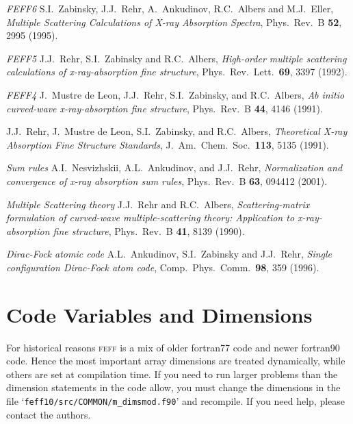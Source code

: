 \documentclass[11pt,oneside]{report} %
\newcommand{\program}[1]{\textsc{#1}}
\newcommand{\feff}{\program{feff}}
\newcommand{\file}[1]{`\texttt{#1}'}
\begin{document}
\begin{latexonly}
\begin{Reflist}
\item [\textit{FEFF6}] S.I.\ Zabinsky, J.J.\ Rehr, A.\ Ankudinov, R.C.\
  Albers and M.J.\ Eller, \emph{Multiple Scattering Calculations of
    X-ray Absorption Spectra}, Phys.\ Rev.\ B \textbf{52}, 2995 (1995).
 
\item [\textit{FEFF5}] J.J.\ Rehr, S.I.\ Zabinsky and R.C.\ Albers,
  \emph{High-order multiple scattering calculations of
    x-ray-absorption fine structure}, Phys.\ Rev.\ Lett.\ \textbf{69},
  3397 (1992).
  
\item [\textit{FEFF4}] J.\ Mustre de Leon, J.J.\ Rehr, S.I.\
  Zabinsky, and R.C.\ Albers, \emph{Ab initio curved-wave
    x-ray-absorption fine structure}, Phys.\ Rev.\ B \textbf{44}, 4146
  (1991).
 
 J.J.\ Rehr, J.\ Mustre de Leon, S.I.\ Zabinsky, and
  R.C.\ Albers, \emph{Theoretical X-ray Absorption Fine Structure
    Standards}, J.\ Am.\ Chem.\ Soc.\ \textbf{113}, 5135 (1991).
 
\item [\textit{Sum rules}]
A.I.\ Nesvizhskii, A.L.\ Ankudinov, and J.J.\ Rehr,
  \emph{Normalization and convergence of x-ray absorption sum
  rules}, Phys.\ Rev.\ B \textbf{63}, 094412 (2001).
 
\item [\textit{Multiple Scattering theory}] J.J.\ Rehr and R.C.\ Albers,
  \emph{Scattering-matrix formulation of curved-wave
    multiple-scattering theory: Application to x-ray-absorption fine
    structure}, Phys.\ Rev.\ B \textbf{41}, 8139 (1990).
 
\item [\textit{Dirac-Fock atomic code}] A.L.\ Ankudinov, S.I.\ Zabinsky and J.J.\
  Rehr, \emph{Single configuration Dirac-Fock atom code}, Comp.\ Phys.\
  Comm.\ \textbf{98}, 359 (1996).

\end{Reflist}



\chapter{Code Variables and Dimensions}
\label{sec:Append-D-Code}
For historical reasons {\feff} is a mix of older fortran77 code and newer
fortran90 code. Hence the most important array dimensions are treated dynamically,
while others are set at compilation time.  If you need
to run larger problems than the dimension statements in the code
allow, you must change the dimensions in the file \file{feff10/src/COMMON/m\_dimsmod.f90} and recompile.
If you need help, please contact the authors.



\end{latexonly}
\end{document}
